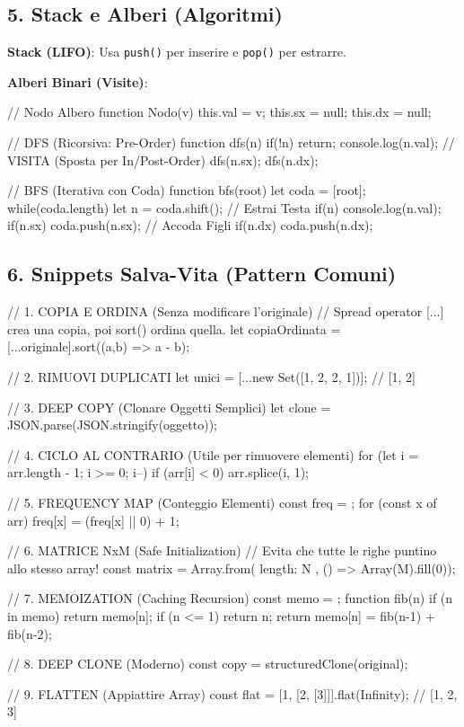 \subsection{5. Stack e Alberi (Algoritmi)}
\textbf{Stack (LIFO)}: Usa \texttt{push()} per inserire e \texttt{pop()} per estrarre.

\textbf{Alberi Binari (Visite)}:
\begin{jsbox}
// Nodo Albero
function Nodo(v) { this.val = v; this.sx = null; this.dx = null; }

// DFS (Ricorsiva: Pre-Order)
function dfs(n) {
    if(!n) return;
    console.log(n.val); // VISITA (Sposta per In/Post-Order)
    dfs(n.sx);
    dfs(n.dx);
}

// BFS (Iterativa con Coda)
function bfs(root) {
    let coda = [root];
    while(coda.length) {
        let n = coda.shift(); // Estrai Testa
        if(n) {
            console.log(n.val);
            if(n.sx) coda.push(n.sx); // Accoda Figli
            if(n.dx) coda.push(n.dx);
        }
    }
}
\end{jsbox}

\subsection{6. Snippets Salva-Vita (Pattern Comuni)}
\begin{jsbox}
// 1. COPIA E ORDINA (Senza modificare l'originale)
// Spread operator [...] crea una copia, poi sort() ordina quella.
let copiaOrdinata = [...originale].sort((a,b) => a - b);

// 2. RIMUOVI DUPLICATI
let unici = [...new Set([1, 2, 2, 1])]; // [1, 2]

// 3. DEEP COPY (Clonare Oggetti Semplici)
let clone = JSON.parse(JSON.stringify(oggetto));

// 4. CICLO AL CONTRARIO (Utile per rimuovere elementi)
for (let i = arr.length - 1; i >= 0; i--) {
   if (arr[i] < 0) arr.splice(i, 1);
}

// 5. FREQUENCY MAP (Conteggio Elementi)
const freq = {};
for (const x of arr) { freq[x] = (freq[x] || 0) + 1; }

// 6. MATRICE NxM (Safe Initialization)
// Evita che tutte le righe puntino allo stesso array!
const matrix = Array.from({ length: N }, () => Array(M).fill(0));

// 7. MEMOIZATION (Caching Recursion)
const memo = {};
function fib(n) {
    if (n in memo) return memo[n];
    if (n <= 1) return n;
    return memo[n] = fib(n-1) + fib(n-2);
}

// 8. DEEP CLONE (Moderno)
const copy = structuredClone(original);

// 9. FLATTEN (Appiattire Array)
const flat = [1, [2, [3]]].flat(Infinity); // [1, 2, 3]
\end{jsbox}
